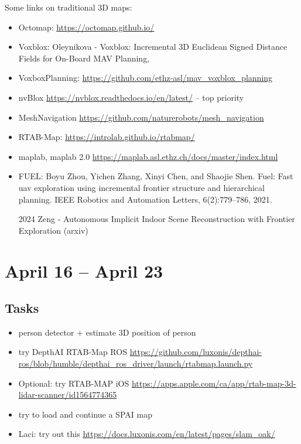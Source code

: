 \documentclass{article}
\begin{document}
Some links on traditional 3D maps:
\begin{itemize}
\item Octomap: \url{https://octomap.github.io/}
\item Voxblox: Oleynikova - Voxblox: Incremental 3D Euclidean Signed Distance Fields for On-Board MAV Planning, 
\item VoxboxPlanning: \url{https://github.com/ethz-asl/mav_voxblox_planning}
\item nvBlox \url{https://nvblox.readthedocs.io/en/latest/} -- top priority
\item MeshNavigation \url{https://github.com/naturerobots/mesh_navigation}
\item RTAB-Map: \url{https://introlab.github.io/rtabmap/}
\item maplab, maplab 2.0 \url{https://maplab.asl.ethz.ch/docs/master/index.html}
\item FUEL: Boyu Zhou, Yichen Zhang, Xinyi Chen, and Shaojie Shen. Fuel: Fast
uav exploration using incremental frontier structure and hierarchical
planning. IEEE Robotics and Automation Letters, 6(2):779–786, 2021.
\item [2024] Zeng - Autonomous Implicit Indoor Scene Reconstruction with Frontier Exploration (arxiv)
\end{itemize}
\newpage

\section{April 16 -- April 23}

\subsection{Tasks}
\begin{itemize}
\item person detector + estimate 3D position of person 
\item try DepthAI RTAB-Map ROS \url{https://github.com/luxonis/depthai-ros/blob/humble/depthai_ros_driver/launch/rtabmap.launch.py} 
\item Optional: try RTAB-MAP iOS \url{https://apps.apple.com/ca/app/rtab-map-3d-lidar-scanner/id1564774365} 
\item try to load and continue a SPAI map 
\item Laci: try out this \url{https://docs.luxonis.com/en/latest/pages/slam_oak/}
\end{itemize}
\end{document}
